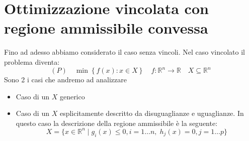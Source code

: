 


\inbpdocument 

\chapter{Ottimizzazione vincolata con regione ammissibile convessa}
Fino ad adesso abbiamo considerato il caso senza vincoli.
Nel caso vincolato il problema diventa:
$$(P) \quad \min \left\{ f(x) : x \in X \right\} \quad
f:\mathbb{R}^{n} \rightarrow \mathbb{R}
\quad X \subseteq \mathbb{R}^{n}
$$
Sono 2 i casi che andremo ad analizzare
\begin{itemize}
 \item  Caso di un $X$ generico
 \item  Caso di un $X$ esplicitamente descritto da  disuguaglianze e uguaglianze. In
    questo caso la descrizione della regione ammissibile \`e la seguente:
     $$ X = \{ x \in \mathbb{R}^{n} \; | \; g_i(x) \leq 0, i =1\ldots n, \; h_j(x)=0, j=1 \ldots p \} $$
     
\end{itemize}


